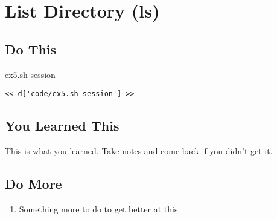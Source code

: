 \chapter{List Directory (ls)}

\section{Do This}

\begin{code}{ex5.sh-session}
\begin{Verbatim}
<< d['code/ex5.sh-session'] >>
\end{Verbatim}
\end{code}


\section{You Learned This}

This is what you learned.  Take notes and come back if you didn't get it.

\section{Do More}

\begin{enumerate}
\item Something more to do to get better at this.
\end{enumerate}

